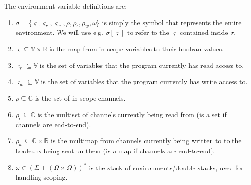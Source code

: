 \documentclass[times,10pt]{article}
\begin{document}
The environment variable definitions are:
\begin{enumerate}
    \item $\sigma = \{\varsigma, \varsigma_r, \varsigma_w, \rho, \rho_r, \rho_w, \omega\}$ is simply the symbol that represents the entire environment. We will use e.g. $\sigma[\varsigma]$ to refer to the $\varsigma$ contained inside $\sigma$.
    \item $\varsigma \subseteq \mathbb{V} \times \mathbb{B}$ is the map from in-scope variables to their boolean values.
    \item $\varsigma_r \subseteq \mathbb{V}$ is the set of variables that the program currently has read access to.
    \item $\varsigma_w \subseteq \mathbb{V}$ is the set of variables that the program currently has write access to.
    \item $\rho \subseteq \mathbb{C}$ is the set of in-scope channels.
    \item $\rho_r \subseteq \mathbb{C}$ is the multiset of channels currently being read from (is a set if channels are end-to-end).
    \item $\rho_w \subseteq \mathbb{C} \times \mathbb{B}$ is the multimap from channels currently being written to to the booleans being sent on them (is a map if channels are end-to-end).
    \item $\omega \in (\Sigma + (\Omega \times \Omega))^*$ is the stack of environments/double stacks, used for handling scoping.
\end{enumerate}
\end{document}
